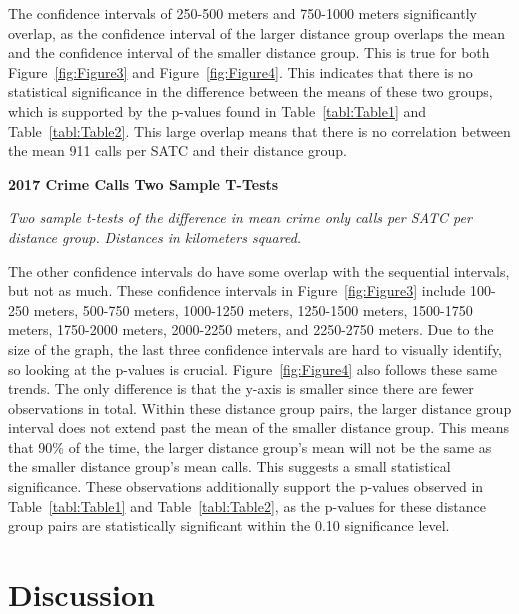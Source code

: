 \documentclass[12pt]{article}
\begin{document}
The confidence intervals of 250-500 meters and 750-1000 meters significantly overlap, as the confidence interval of the larger distance group overlaps the mean and the confidence interval of the smaller distance group. This is true for both Figure~\ref{fig:Figure3} and Figure~\ref{fig:Figure4}. This indicates that there is no statistical significance in the difference between the means of these two groups, which is supported by the p-values found in Table~\ref{tabl:Table1} and Table~\ref{tabl:Table2}. This large overlap means that there is no correlation between the mean 911 calls per SATC and their distance group. 

\begin{table}[h!]
\begin{center}

\end{center}


\caption{\bf{2017 Crime Calls Two Sample T-Tests}}
\label{tabl:Table2}
\centering\textit{Two sample t-tests of the difference in mean crime only calls per SATC per distance group.}
\textit{Distances in kilometers squared.}
\end{table}

The other confidence intervals do have some overlap with the sequential intervals, but not as much. These confidence intervals in Figure~\ref{fig:Figure3} include 100-250 meters, 500-750 meters, 1000-1250 meters, 1250-1500 meters, 1500-1750 meters, 1750-2000 meters, 2000-2250 meters, and 2250-2750 meters. Due to the size of the graph, the last three confidence intervals are hard to visually identify, so looking at the p-values is crucial. Figure~\ref{fig:Figure4} also follows these same trends. The only difference is that the y-axis is smaller since there are fewer observations in total. Within these distance group pairs, the larger distance group interval does not extend past the mean of the smaller distance group. This means that 90\% of the time, the larger distance group's mean will not be the same as the smaller distance group's mean calls. This suggests a small statistical significance. These observations additionally support the p-values observed in Table~\ref{tabl:Table1} and Table~\ref{tabl:Table2}, as the p-values for these distance group pairs are statistically significant within the 0.10 significance level. 


\break
\section{Discussion}
\label{sec:discussion}
\end{document}
